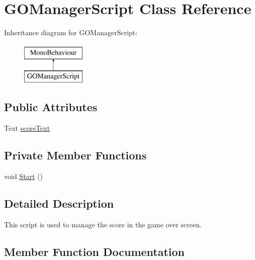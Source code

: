 \hypertarget{class_g_o_manager_script}{}\section{G\+O\+Manager\+Script Class Reference}
\label{class_g_o_manager_script}
Inheritance diagram for G\+O\+Manager\+Script\+:\begin{figure}[H]
\begin{center}
\leavevmode
\includegraphics[height=2.000000cm]{class_g_o_manager_script}
\end{center}
\end{figure}
\subsection*{Public Attributes}
\begin{DoxyCompactItemize}
\item 
Text \hyperlink{class_g_o_manager_script_ae6df0f7858c9b610f96af2e6bc84dcad}{score\+Text}
\end{DoxyCompactItemize}
\subsection*{Private Member Functions}
\begin{DoxyCompactItemize}
\item 
void \hyperlink{class_g_o_manager_script_ad493e0419dd25ba9aa8f6945340c1711}{Start} ()
\end{DoxyCompactItemize}


\subsection{Detailed Description}
This script is used to manage the score in the game over screen. 

\subsection{Member Function Documentation}
\hypertarget{class_g_o_manager_script_ad493e0419dd25ba9aa8f6945340c1711}{}
